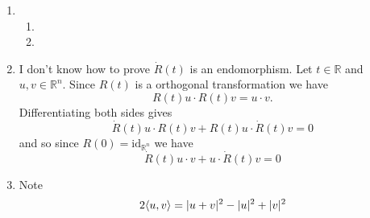 \documentclass[a4paper, 12pt]{article}
\newcommand{\R}{\mathbb{R}}
\DeclarePairedDelimiter\abs{\lvert}{\rvert}
\begin{document}
\begin{enumerate}
\item \begin{enumerate}

\item

\item

\end{enumerate}

\item I don't know how to prove \(\dot R(t)\) is an endomorphism. Let \(t\in\R\) and \(u,v\in\R^n\). Since \(R(t)\) is a orthogonal transformation we have
\[R(t)u\cdot R(t)v=u\cdot v.\]
Differentiating both sides gives
\[\dot R(t)u\cdot R(t)v+R(t)u\cdot\dot R(t)v=0\]
and so since \(R(0)=\text{id}_{\R^n}\) we have
\[\dot R(t)u\cdot v+u\cdot\dot R(t)v=0\]

\item Note
\[2\langle u,v\rangle=\abs{u+v}^2-\abs{u}^2+\abs{v}^2\]

\end{enumerate}
\end{document}

